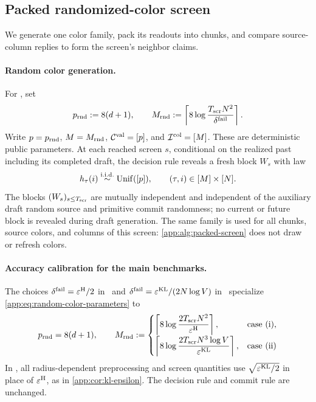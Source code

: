 \subsection{Packed randomized-color screen}
\label{app:algorithm-screen}

We generate one color family, pack its readouts into chunks, and compare
source-column replies to form the screen's neighbor claims.

\paragraph{Random color generation.}
For , set
\begin{equation}
 p_{\mathrm{rnd}}:=8(d+1),
 \qquad
 M_{\mathrm{rnd}}
 :=\left\lceil
 8\log\frac{T_{\mathrm{scr}} N^2}{\delta^{\mathrm{fail}}}
 \right\rceil.
 \label{app:eq:random-color-parameters}
\end{equation}
Write $p=p_{\mathrm{rnd}}$,
$M=M_{\mathrm{rnd}}$,
$\mathcal C^{\mathrm{val}}=[p]$, and $\mathcal I^{\mathrm{col}}=[M]$.
These are deterministic public parameters.
At each reached screen $s$, conditional on the realized past including its
completed draft, the decision rule reveals a fresh block $W_s$ with law
\begin{equation}
 h_{\tau}(i)
 \overset{\mathrm{i.i.d.}}{\sim}\operatorname{Unif}([p]),
 \qquad
 (\tau,i)\in[M]\times[N].
 \label{app:eq:random-color-draw}
\end{equation}
The blocks $(W_s)_{s\le T_{\mathrm{scr}}}$ are mutually independent and independent
of the auxiliary draft random source and primitive commit randomness;
no current or future block is revealed during draft generation.
The same family is used for all chunks, source colors, and columns of this
screen: \cref{app:alg:packed-screen} does not draw or refresh colors.

\paragraph{Accuracy calibration for the main benchmarks.}
The choices $\delta^{\mathrm{fail}}=\varepsilon^{\mathrm H}/2$ in \HellingerCase\
and $\delta^{\mathrm{fail}}=\varepsilon^{\mathrm{KL}}/(2N\log V)$ in
\KLCase\ specialize \eqref{app:eq:random-color-parameters} to
\begin{equation}
 p_{\mathrm{rnd}}=8(d+1),
 \qquad
 M_{\mathrm{rnd}}
 :=\begin{cases}
 \displaystyle\left\lceil
 8\log\frac{2T_{\mathrm{scr}} N^2}{\varepsilon^{\mathrm H}}
 \right\rceil,&\text{case~(i)},\\[6pt]
 \displaystyle\left\lceil
 8\log\frac{2T_{\mathrm{scr}} N^3\log V}{\varepsilon^{\mathrm{KL}}}
 \right\rceil,&\text{case~(ii)}
 \end{cases}
 \label{app:eq:accuracy-color-parameters}
\end{equation}
In \KLCase, all radius-dependent preprocessing and screen quantities use
$\sqrt{\varepsilon^{\mathrm{KL}}/2}$ in place of $\varepsilon^{\mathrm H}$,
as in \cref{app:cor:kl-epsilon}. The decision rule and commit rule
are unchanged.

